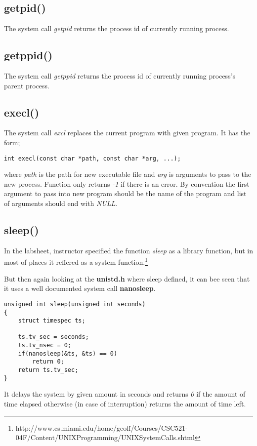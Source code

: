 \documentclass[11pt]{article}
\begin{document}
\subsection*{getpid()}
The system call \textit{getpid} returns the process id of currently running process.

\subsection*{getppid()}
The system call \textit{getppid} returns the process id of currently running process's parent process.

\subsection*{execl()}
The system call \textit{excl} replaces the current program with given program. It has the form;

\begin{lstlisting}[frame=tlrb]
int execl(const char *path, const char *arg, ...);
\end{lstlisting}

where \textit{path} is the path for new executable file and \textit{arg} is arguments to pass to the new process. Function only returns \textit{-1} if there is an error. By convention the first argument to pass into new program should be the name of the program and list of arguments should end with \textit{NULL}.

\subsection*{sleep()}
In the labsheet, instructor specified the function \textit{sleep} as a library function, but in most of places it reffered as a system function.\footnote{http://www.cs.miami.edu/home/geoff/Courses/CSC521-04F/Content/UNIXProgramming/UNIXSystemCalls.shtml}

But then again looking at the \textbf{unistd.h} where sleep defined, it can bee seen that it uses a well documented system call \textbf{nanosleep}.

\begin{lstlisting}[frame=tlrb]
unsigned int sleep(unsigned int seconds)
{
	struct timespec ts;
	
	ts.tv_sec = seconds;
	ts.tv_nsec = 0;
	if(nanosleep(&ts, &ts) == 0)
		return 0;
	return ts.tv_sec;
}
\end{lstlisting}

It delays the system by given amount in seconds and returns \textit{0} if the amount of time elapsed otherwise (in case of interruption) returns the amount of time left.
\end{document}

